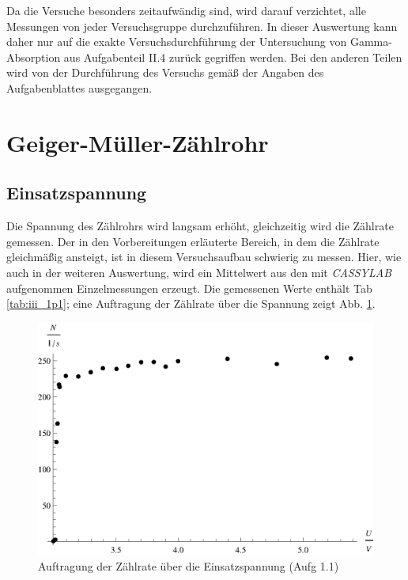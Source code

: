 Da die Versuche besonders zeitaufwändig sind, wird darauf verzichtet, alle Messungen von jeder Versuchsgruppe durchzuführen. In dieser Auswertung kann daher nur auf die exakte Versuchsdurchführung der Untersuchung von Gamma-Absorption aus Aufgabenteil II.4 zurück gegriffen werden. Bei den anderen Teilen wird von der Durchführung des Versuchs gemäß der Angaben des Aufgabenblattes ausgegangen.\\

\section{Geiger-Müller-Zählrohr}
\subsection{Einsatzspannung}
Die Spannung des Zählrohrs wird langsam erhöht, gleichzeitig wird die Zählrate gemessen. Der in den Vorbereitungen erläuterte Bereich, in dem die Zählrate gleichmäßig ansteigt, ist in diesem Versuchsaufbau schwierig zu messen. Hier, wie auch in der weiteren Auswertung, wird ein Mittelwert aus den mit \textit{CASSYLAB} aufgenommen Einzelmessungen erzeugt. Die gemessenen Werte enthält Tab \ref{tab:iii_1p1}; eine Auftragung der Zählrate über die Spannung zeigt Abb. \ref{fig:iii_1p1}.

\begin{figure}[ht]
\centering
\includegraphics[scale=1.0]{fig/iii_1p1.eps}
\caption{Auftragung der Zählrate über die Einsatzspannung (Aufg 1.1)}
\label{fig:iii_1p1}
\end{figure}

\begin{table}[ht]
\centering
\caption{Messung der Zählrate über die Einsatzspannung (Aufg 1.1)}
\label{tab:iii_1p1}



\end{table}

